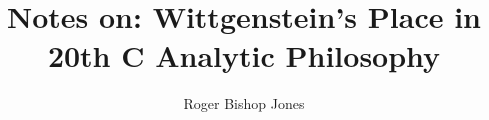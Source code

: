 \documentclass[10pt,titlepage]{book}
\begin{document}
\author{Roger Bishop Jones}
\title{Notes on: Wittgenstein's Place in 20th C Analytic Philosophy}
\maketitle
\tableofcontents
\end{document}
